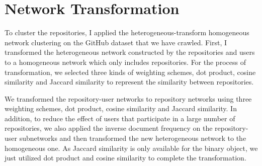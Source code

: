 \documentclass[12pt,oneside,final]{vlsithesis}
\begin{document}
\chapter{Network Transformation}\label{chapter:network transformation}
To cluster the repositories, I applied the heterogeneous-transform homogeneous network clustering \cite{huang2014clustering} on the GitHub dataset that we have crawled. First, I transformed the heterogeneous network constructed by the repositories and users to a homogeneous network which only includes repositories. For the process of transformation, we selected three kinds of weighting schemes, dot product, cosine similarity and Jaccard similarity to represent the similarity between repositories. 

We transformed the repository-user networks to repository networks using three weighting schemes, dot product, cosine similarity and Jaccard similarity. In addition, to reduce the effect of users that participate in a large number of repositories, we also applied the inverse document frequency on the repository-user subnetworks and then transformed the new heterogeneous network to the homogeneous one. As Jaccard similarity is only available for the binary object, we just utilized dot product and cosine similarity to complete the transformation. 
\end{document}

